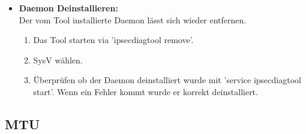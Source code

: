 \begin{itemize}
\item[\Square] \textbf{Daemon Deinstallieren:} \\
Der vom Tool installierte Daemon lässt sich wieder entfernen.
\begin{enumerate} \itemsep1pt \parskip0pt 
  \item Das Tool starten via 'ipsecdiagtool remove'.
  \item SysV wählen.
  \item Überprüfen ob der Daemon deinstalliert wurde mit 'service ipsecdiagtool start'. Wenn ein Fehler kommt wurde er korrekt deinstalliert.
\end{enumerate}
			   
\end{itemize}

\subsection{MTU}
